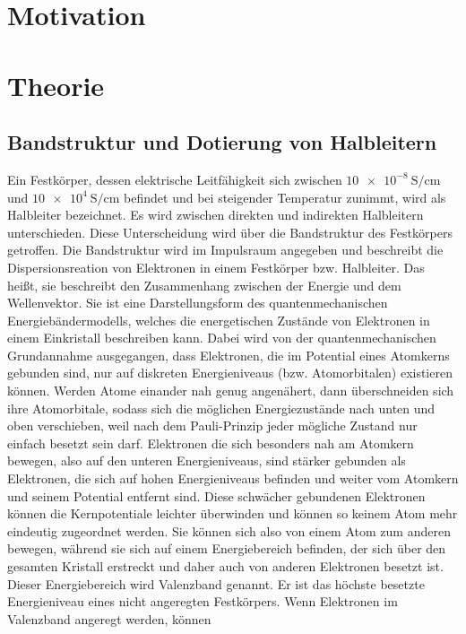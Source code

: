 \section{Motivation}
\label{sec:Motivation}

\section{Theorie}
\label{sec:Theorie}

\subsection{Bandstruktur und Dotierung von Halbleitern}
Ein Festkörper, dessen elektrische Leitfähigkeit sich zwischen $\SI{10e-8}{\siemens\per\centi\meter}$
und $\SI{10e4}{\siemens\per\centi\meter}$ befindet und bei steigender Temperatur 
zunimmt, wird als Halbleiter bezeichnet. 
Es wird zwischen direkten und indirekten Halbleitern unterschieden.
Diese Unterscheidung wird über die Bandstruktur des Festkörpers getroffen.
Die Bandstruktur wird im Impulsraum angegeben und beschreibt die 
Dispersionsreation von Elektronen in einem Festkörper bzw. Halbleiter. 
Das heißt, sie beschreibt den Zusammenhang zwischen der Energie und dem Wellenvektor.
Sie ist eine Darstellungsform des quantenmechanischen Energiebändermodells, welches 
die energetischen Zustände von Elektronen in einem Einkristall beschreiben kann.
Dabei wird von der quantenmechanischen Grundannahme ausgegangen, dass Elektronen, die 
im Potential eines Atomkerns gebunden sind, nur auf diskreten Energieniveaus 
(bzw. Atomorbitalen) existieren können. Werden Atome einander nah genug angenähert,
dann überschneiden sich ihre Atomorbitale, sodass sich die möglichen Energiezustände 
nach unten und oben verschieben, weil nach dem Pauli-Prinzip jeder mögliche Zustand nur 
einfach besetzt sein darf. Elektronen die sich besonders nah
am Atomkern bewegen, also auf den unteren 
Energieniveaus, sind stärker gebunden als Elektronen, die sich auf hohen 
Energieniveaus befinden und weiter vom Atomkern und seinem Potential entfernt sind. 
Diese schwächer gebundenen Elektronen können die Kernpotentiale leichter überwinden 
und können so keinem Atom mehr eindeutig zugeordnet werden. Sie können sich also von einem 
Atom zum anderen bewegen, während sie sich auf einem Energiebereich befinden, der sich über 
den gesamten Kristall erstreckt und daher auch von anderen Elektronen besetzt ist.
Dieser Energiebereich wird Valenzband genannt. Er ist das höchste besetzte Energieniveau 
eines nicht angeregten Festkörpers. Wenn Elektronen im Valenzband angeregt werden, können 
